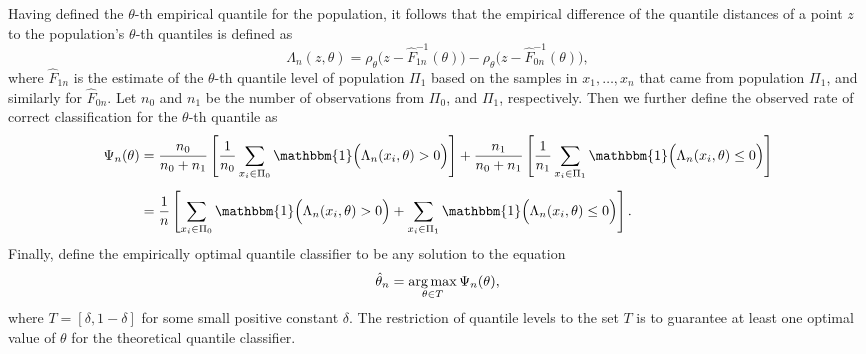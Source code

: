 Having defined the $\theta$-th empirical quantile for the population, it follows
that the empirical difference of the quantile distances of a point $z$ to the
population's $\theta$-th quantiles is defined as
\[
  \Lambda_n (z, \theta) = \rho_{\theta}\Big(z - \hat{F}_{1n}^{-1}(\theta)\Big) -
  \rho_{\theta}\Big(z - \hat{F}_{0n}^{-1}(\theta)\Big),
\]
where $\hat{F}_{1n}$ is the estimate of the $\theta$-th quantile level of
population $\Pi_1$ based on the samples in $x_1, \dots, x_n$ that came from
population $\Pi_1$, and similarly for $\hat{F}_{0n}$.  Let $n_0$ and $n_1$
be the number of observations from $\Pi_0$, and $\Pi_1$, respectively.  Then we
further define the observed rate of correct classification for the $\theta$-th
quantile as
\begin{align}
  \begin{split}
    \Psi_n(\theta)
    &= \frac{n_0}{n_0 + n_1} \left[
      \frac{1}{n_0} \sum_{x_i \in \Pi_0}
      \mathbbm{1}\Big( \Lambda_n(x_i, \theta) > 0 \Big)
    \right] +
      \frac{n_1}{n_0 + n_1} \left[
        \frac{1}{n_1} \sum_{x_i \in \Pi_1}
        \mathbbm{1}\Big( \Lambda_n(x_i, \theta) \leq 0 \Big)
      \right] \\[1ex]
    &= \frac{1}{n} \left[
      \sum_{x_i \in \Pi_0} \mathbbm{1}\Big( \Lambda_n(x_i, \theta) > 0 \Big) +
      \sum_{x_i \in \Pi_1} \mathbbm{1}\Big( \Lambda_n(x_i, \theta) \leq 0 \Big)
    \right].
  \end{split}
\end{align}
Finally, define the empirically optimal quantile classifier to be any solution
to the equation
\begin{equation}
  \label{eq:theta-hat}
  \hat{\theta}_n = \operatorname*{arg\,max}_{\theta \in T} \Psi_n(\theta),
\end{equation}
where $T = [\delta, 1 - \delta]$ for some small positive constant $\delta$.  The
restriction of quantile levels to the set $T$ is to guarantee at least one
optimal value of $\theta$ for the theoretical quantile classifier.



